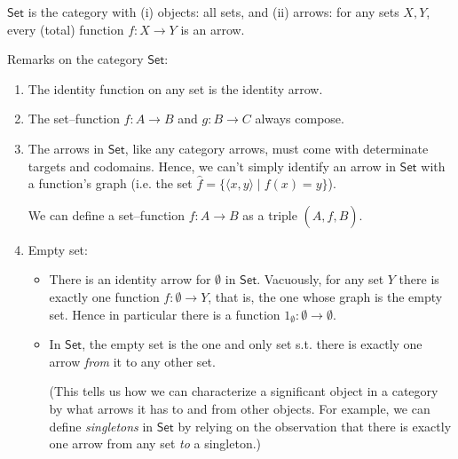 \begin{example} 

    {\color{purple} $\mathsf{Set}$} is the category with (i) objects: all sets, and (ii) arrows: for any sets $X,Y$, every (total) function $f \colon X \to Y$ is an arrow.

    Remarks on the category $\mathsf{Set}$:
    \begin{enumerate}[itemsep=1pt,parsep=5pt,leftmargin=4em,topsep=1pt,label=(\arabic*)] 
        \item The identity function on any set is the identity arrow.

        \item The set--function $f \colon A \to B$ and $g \colon B \to C$ always compose.
        
        \item The arrows in $\mathsf{Set}$, like any category arrows, must come with determinate targets and codomains. 
        Hence, we can't simply identify an arrow in $\mathsf{Set}$ with a function's {\color{teal} graph} (i.e. the set $\hat{f}=\{\langle x,y \rangle \mid f(x)=y\}$). 

        We can define a set--function $f \colon A \to B$ as a triple $(A,\hat{f},B)$.


        \item {\color{teal} Empty set}: 
            \begin{itemize}
                \item There is an identity arrow for $\emptyset$ in $\mathsf{Set}$. 
                Vacuously, for any set $Y$ there is exactly one function $f \colon \emptyset \to Y$, that is, the one whose graph is the empty set. Hence in  particular there is a function $1_\emptyset \colon \emptyset \to \emptyset$.


                \item In $\mathsf{Set}$, 
                the empty set is the one and only set s.t. there is exactly one arrow \textit{from} it to any other set.

                (This tells us how we can characterize a significant object in a category by what arrows it has to and from other objects. 
                For example, we can define {\color{teal} \textit{singletons}} in $\mathsf{Set}$ by relying on the observation that there is exactly one arrow from any set \textit{to} a singleton.)
            \end{itemize}
        

        
    \end{enumerate}
\end{example}


